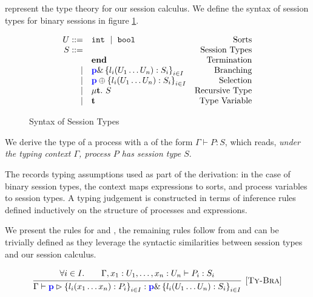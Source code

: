  represent the type theory for our session calculus. We define the syntax of session types for binary sessions in figure \ref{fig:bst}. 

\begin{figure}[!hb]
\doublespacing
\[
\begin{array}{rlr}

U ::= & \text{\tt{int}}~\mid~\text{\tt{bool}} & \text{Sorts} \\

S ::= & & \text{Session Types} \\
     & \mathbf{end} & \text{Termination} \\
\mid & {\color{blue}\mathbf{p}} \& \left\{l_i(U_1 \dots U_n):S_i\right\}_{i\in I} & \text{Branching} \\
\mid & {\color{blue}\mathbf{p}} \oplus \left\{l_i(U_1 \dots U_n):S_i\right\}_{i\in I} & \text{Selection} \\
\mid & \mu \mathbf{t}.~S & \text{Recursive Type} \\
\mid & \mathbf{t} & \text{Type Variable} \\
\end{array}
\]

\singlespacing
\caption{Syntax of Session Types}
\label{fig:bst}
\end{figure}

We derive the type of a process with a  of the form $\Gamma \vdash P: S$, which reads, \textit{under the typing context $\Gamma$, process $P$ has session type $S$}. 

The  records typing assumptions used as part of the derivation: in the case of binary session types, the context maps expressions to sorts, and process variables to session types. A typing judgement is constructed in terms of inference rules defined inductively on the structure of processes and expressions.

We present the rules for  and , the remaining rules follow from \cite{C406Lecture} and can be trivially defined as they leverage the syntactic similarities between session types and our session calculus.

\[
\infer[\mbox{\rulename{Ty-Bra}}]{
	\Gamma \vdash \bra{\parti{p}}{l_i(x_1 \dots x_n):P_i}_{i\in I} : \tybra{\parti{p}}{l_i(U_1 \dots U_n):S_i}_{i\in I}
	}{
	\begin{array}{ccc}
	\forall i \in I.
	&
	&
    \Gamma, x_1: U_1, \dots, x_n: U_n \vdash P_i : S_i		
	\end{array}
}
\]

